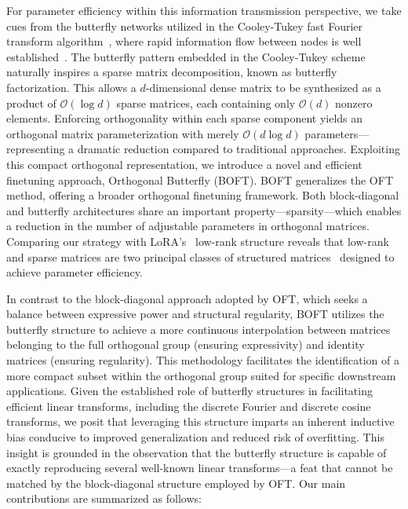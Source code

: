 For parameter efficiency within this information transmission perspective, we take cues from the butterfly networks utilized in the Cooley-Tukey fast Fourier transform algorithm~\cite{cooley1965algorithm}, where rapid information flow between nodes is well established~\cite{klasing1994broadcasting}. The butterfly pattern embedded in the Cooley-Tukey scheme naturally inspires a sparse matrix decomposition, known as butterfly factorization. This allows a $d$-dimensional dense matrix to be synthesized as a product of $\mathcal{O}(\log d)$ sparse matrices, each containing only $\mathcal{O}(d)$ nonzero elements. Enforcing orthogonality within each sparse component yields an orthogonal matrix parameterization with merely $\mathcal{O}(d\log d)$ parameters—representing a dramatic reduction compared to traditional approaches. Exploiting this compact orthogonal representation, we introduce a novel and efficient finetuning approach, Orthogonal Butterfly (BOFT). BOFT generalizes the OFT method, offering a broader orthogonal finetuning framework. Both block-diagonal and butterfly architectures share an important property—sparsity—which enables a reduction in the number of adjustable parameters in orthogonal matrices. Comparing our strategy with LoRA's~\cite{hulora2022} low-rank structure reveals that low-rank and sparse matrices are two principal classes of structured matrices~\cite{candes2011robust} designed to achieve parameter efficiency.

In contrast to the block-diagonal approach adopted by OFT, which seeks a balance between expressive power and structural regularity, BOFT utilizes the butterfly structure to achieve a more continuous interpolation between matrices belonging to the full orthogonal group (ensuring expressivity) and identity matrices (ensuring regularity). This methodology facilitates the identification of a more compact subset within the orthogonal group suited for specific downstream applications. Given the established role of butterfly structures in facilitating efficient linear transforms, including the discrete Fourier and discrete cosine transforms, we posit that leveraging this structure imparts an inherent inductive bias conducive to improved generalization and reduced risk of overfitting. This insight is grounded in the observation that the butterfly structure is capable of exactly reproducing several well-known linear transforms—a feat that cannot be matched by the block-diagonal structure employed by OFT. Our main contributions are summarized as follows:

